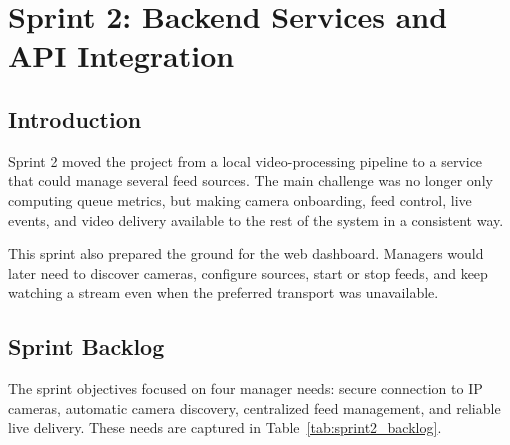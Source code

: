 \chapter{Sprint 2: Backend Services and API Integration}
\chaptertoc

\clearpage

\section{Introduction}
Sprint 2 moved the project from a local video-processing pipeline to a service that could manage several feed sources. The main challenge was no longer only computing queue metrics, but making camera onboarding, feed control, live events, and video delivery available to the rest of the system in a consistent way.

This sprint also prepared the ground for the web dashboard. Managers would later need to discover cameras, configure sources, start or stop feeds, and keep watching a stream even when the preferred transport was unavailable.

\section{Sprint Backlog}
The sprint objectives focused on four manager needs: secure connection to IP cameras, automatic camera discovery, centralized feed management, and reliable live delivery. These needs are captured in Table~\ref{tab:sprint2_backlog}.

